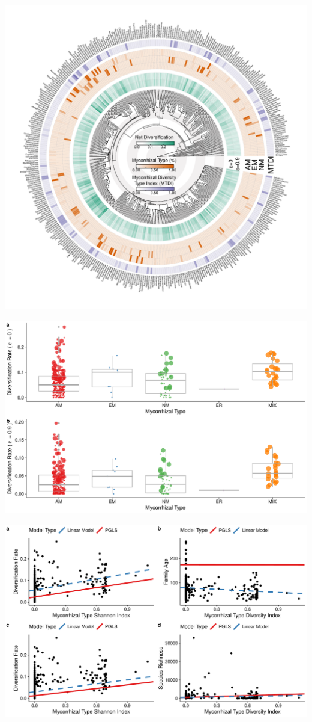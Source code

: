 \documentclass[12pt,]{article}
\begin{document}
\includegraphics{../output/tree_fig/phylo_genus_final_resized.pdf}

\newpage

\includegraphics{../output/figs/boxplots_netdiv_myctype.pdf}

\newpage

\includegraphics{../output/figs/scatterplots_lm_pgls_stem.pdf}
\end{document}
